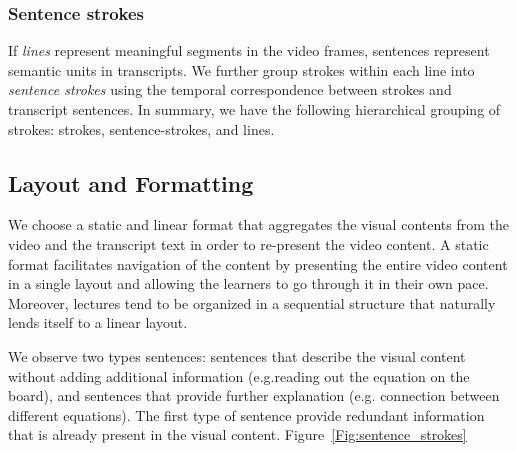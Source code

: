 \subsubsection{Sentence strokes}
If \textit{lines} represent meaningful segments in the video frames, sentences represent semantic units in transcripts. We further group strokes within each line into \textit{sentence strokes} using the temporal correspondence between strokes and transcript sentences. In summary, we have the following hierarchical grouping of strokes: strokes, sentence-strokes, and lines.



\subsection{Layout and Formatting}
We choose a static and linear format that aggregates the visual contents from the video and the transcript text in order to re-present the video content. A static format facilitates navigation of the content by presenting the entire video content in a single layout and  allowing the learners to go through it in their own pace. Moreover, lectures tend to be organized in a sequential structure that naturally lends itself to a linear layout. 

We observe two types sentences: sentences that describe the visual content without adding additional information (e.g.reading out the equation on the board), and sentences that provide further explanation (e.g. connection between different equations). The first type of sentence provide redundant information that is already present in the visual content. Figure~\ref{Fig:sentence_strokes} 


